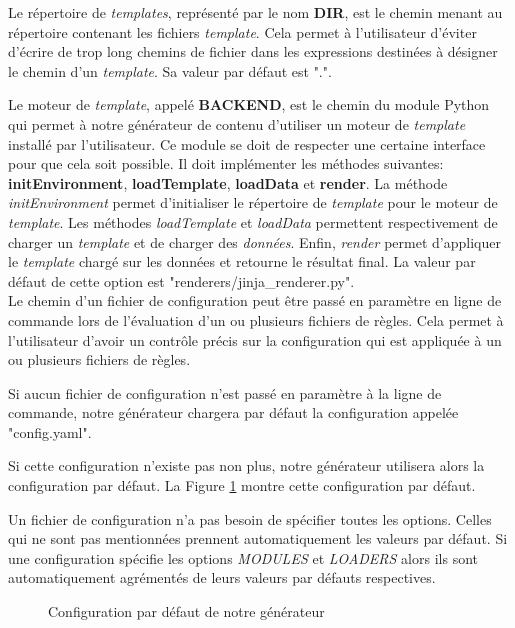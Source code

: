 		Le répertoire de \textit{templates}, représenté par le nom \textbf{DIR}, est le chemin menant au répertoire contenant les fichiers \textit{template}. Cela permet à l'utilisateur d'éviter d'écrire de trop long chemins de fichier dans les expressions destinées à désigner le chemin d'un \textit{template}. Sa valeur par défaut est ".".
		
		Le moteur de \textit{template}, appelé \textbf{BACKEND}, est le chemin du module Python qui permet à notre générateur de contenu d'utiliser un moteur de \textit{template} installé par l'utilisateur. Ce module se doit de respecter une certaine interface pour que cela soit possible. Il doit implémenter les méthodes suivantes: \textbf{initEnvironment}, \textbf{loadTemplate}, \textbf{loadData} et \textbf{render}. La méthode \textit{initEnvironment} permet d'initialiser le répertoire de \textit{template} pour le moteur de \textit{template}. Les méthodes \textit{loadTemplate} et \textit{loadData} permettent respectivement de charger un \textit{template} et de charger des \textit{données}. Enfin, \textit{render} permet d'appliquer le \textit{template} chargé sur les données et retourne le résultat final. La valeur par défaut de cette option est "renderers/jinja\_renderer.py".\\
		
		Le chemin d'un fichier de configuration peut être passé en paramètre en ligne de commande lors de l'évaluation d'un ou plusieurs fichiers de règles. Cela permet à l'utilisateur d'avoir un contrôle précis sur la configuration qui est appliquée à un ou plusieurs fichiers de règles.
		
		Si aucun fichier de configuration n'est passé en paramètre à la ligne de commande, notre générateur chargera par défaut la configuration appelée "config.yaml".
		
		Si cette configuration n'existe pas non plus, notre générateur utilisera alors la configuration par défaut. La Figure \ref{fig:config:default} montre cette configuration par défaut.
		
		Un fichier de configuration n'a pas besoin de spécifier toutes les options. Celles qui ne sont pas mentionnées prennent automatiquement les valeurs par défaut.	Si une configuration spécifie les options \textit{MODULES} et \textit{LOADERS} alors ils sont automatiquement agrémentés de leurs valeurs par défauts respectives.
		
		\begin{figure}[!]
			\centering
			
			\caption{Configuration par défaut de notre générateur}
			\label{fig:config:default}
		\end{figure}
		
